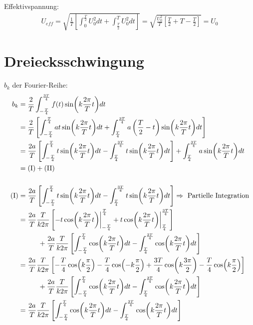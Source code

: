 Effektivspannung:
\begin{gather}
    U_{eff} = \sqrt{\frac{1}{T}\left[\int^{\frac{T}{2}}_0 U_0^2dt + \int^T_{\frac{T}{2}} U_0^2 dt\right]} = \sqrt{\frac{U_0^2}{T}\left[\frac{T}{2}+T-\frac{T}{2}\right]} = U_0
\end{gather}

\section*{Dreiecksschwingung}
$b_k$ der Fourier-Reihe:
\begin{gather}
    \begin{aligned}
        b_k &= \frac{2}{T} \int^{\frac{3T}{4}}_{-\frac{T}{4}} f(t)\sin(k \frac{2\pi}{T} t)dt\\
            &= \frac{2}{T} \left[\int^{\frac{T}{4}}_{-\frac{T}{4}} at\sin(k \frac{2\pi}{T} t)dt+ \int^{\frac{3T}{4}}_{\frac{T}{4}} a\left(\frac{T}{2}-t\right)\sin(k \frac{2\pi}{T} t)dt\right]\\
            &= \frac{2a}{T} \left[\int^{\frac{T}{4}}_{-\frac{T}{4}} t\sin(k \frac{2\pi}{T} t)dt - \int^{\frac{3T}{4}}_{\frac{T}{4}}t\sin(k \frac{2\pi}{T} t)dt\right] + \int^{\frac{3T}{4}}_{\frac{T}{4}}a\sin(k \frac{2\pi}{T} t)dt\\
            &= (\text{I}) + (\text{II})\\[0,5cm]
        (\text{I}) &= \frac{2a}{T} \left[\int^{\frac{T}{4}}_{-\frac{T}{4}} t\sin(k \frac{2\pi}{T} t)
            dt - \int^{\frac{3T}{4}}_{\frac{T}{4}}t\sin(k \frac{2\pi}{T} t)dt\right] \Rightarrow~\text{Partielle Integration}\\
            &= \frac{2a}{T}\frac{T}{k2\pi} \left[-t\cos(k \frac{2\pi}{T} t) \bigg \vert^{\frac{T}{4}}_{-\frac{T}{4}} + t\cos(k \frac{2\pi}{T} t) \bigg \vert^{\frac{3T}{4}}_{\frac{T}{4}}\right]\\
            &\tab+\frac{2a}{T}\frac{T}{k2\pi}\left[\int^{\frac{T}{4}}_{-\frac{T}{4}} \cos(k \frac{2\pi}{T} t)dt - \int^{\frac{3T}{4}}_{\frac{T}{4}} \cos(k \frac{2\pi}{T} t)dt\right]\\
            &= \frac{2a}{T}\frac{T}{k2\pi} \left[-\frac{T}{4}\cos(k \frac{\pi}{2}) -\frac{T}{4}\cos(- k \frac{\pi}{2}) + \frac{3T}{4} \cos(k \frac{3\pi}{2}) - \frac{T}{4} \cos(k \frac{\pi}{2}) \right]\\
            &\tab+\frac{2a}{T}\frac{T}{k2\pi}\left[\int^{\frac{T}{4}}_{-\frac{T}{4}} \cos(k \frac{2\pi}{T} t)dt - \int^{\frac{3T}{4}}_{\frac{T}{4}} \cos(k \frac{2\pi}{T} t)dt\right]\\
            &= \frac{2a}{T}\frac{T}{k2\pi}\left[\int^{\frac{T}{4}}_{-\frac{T}{4}} \cos(k \frac{2\pi}{T} t)dt - \int^{\frac{3T}{4}}_{\frac{T}{4}} \cos(k \frac{2\pi}{T} t)dt\right]\\

\end{aligned}
\end{gather}
